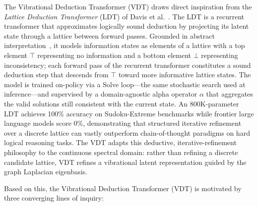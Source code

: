 \documentclass[11pt,a4paper]{article}
\begin{document}
The Vibrational Deduction Transformer (VDT) draws direct inspiration from the
\emph{Lattice Deduction Transformer} (LDT) of Davis et al.~\cite{davis2026ldt}.
The LDT is a recurrent transformer that approximates logically sound deduction
by projecting its latent state through a lattice between forward passes.
Grounded in abstract interpretation~\cite{cousot1977}, it models information states
as elements of a lattice with a top element $\top$ representing no information and a
bottom element $\bot$ representing inconsistency; each forward pass of the recurrent
transformer constitutes a sound deduction step that descends from $\top$ toward
more informative lattice states.
The model is trained on-policy via a Solve loop---the same stochastic search
used at inference---and supervised by a domain-agnostic alpha operator $\alpha$
that aggregates the valid solutions still consistent with the current state.
An 800K-parameter LDT achieves 100\% accuracy on Sudoku-Extreme benchmarks
while frontier large language models score 0\%, demonstrating that structured
iterative refinement over a discrete lattice can vastly outperform chain-of-thought
paradigms on hard logical reasoning tasks.
The VDT adapts this deductive, iterative-refinement philosophy to the continuous
spectral domain: rather than refining a discrete candidate lattice, VDT refines
a vibrational latent representation guided by the graph Laplacian eigenbasis.

Based on this, the Vibrational Deduction Transformer (VDT) is motivated by three converging
lines of inquiry:
\end{document}
